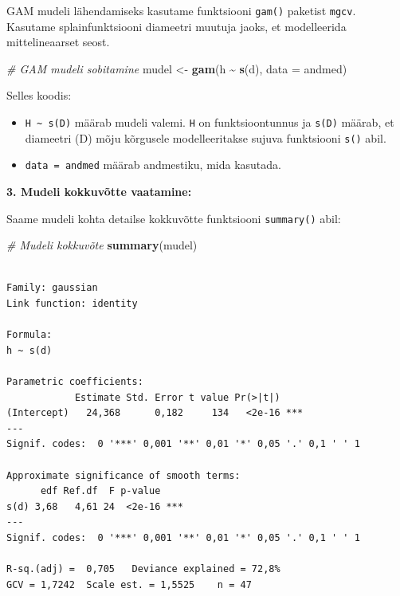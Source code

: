 \documentclass[
]{book}
\newenvironment{Shaded}{\begin{snugshade}}{\end{snugshade}}
\newcommand{\AttributeTok}[1]{\textcolor[rgb]{0.13,0.29,0.53}{#1}}
\newcommand{\CommentTok}[1]{\textcolor[rgb]{0.56,0.35,0.01}{\textit{#1}}}
\newcommand{\FunctionTok}[1]{\textcolor[rgb]{0.13,0.29,0.53}{\textbf{#1}}}
\newcommand{\NormalTok}[1]{#1}
\newcommand{\OtherTok}[1]{\textcolor[rgb]{0.56,0.35,0.01}{#1}}
\newcommand{\SpecialCharTok}[1]{\textcolor[rgb]{0.81,0.36,0.00}{\textbf{#1}}}
\providecommand{\tightlist}{%
  \setlength{\itemsep}{0pt}\setlength{\parskip}{0pt}}
\renewenvironment{Shaded} {\begin{snugshade}\footnotesize} {\end{snugshade}}
\theoremstyle{definition}
\theoremstyle{definition}
\theoremstyle{definition}
\theoremstyle{definition}
\theoremstyle{remark}
\begin{document}
GAM mudeli lähendamiseks kasutame funktsiooni \texttt{gam()} paketist \texttt{mgcv}. Kasutame splainfunktsiooni diameetri muutuja jaoks, et modelleerida mittelineaarset seost.

\begin{Shaded}
\begin{Highlighting}[]
\CommentTok{\# GAM mudeli sobitamine}
\NormalTok{mudel }\OtherTok{\textless{}{-}} \FunctionTok{gam}\NormalTok{(h }\SpecialCharTok{\textasciitilde{}} \FunctionTok{s}\NormalTok{(d), }\AttributeTok{data =}\NormalTok{ andmed)}
\end{Highlighting}
\end{Shaded}

Selles koodis:

\begin{itemize}
\tightlist
\item
  \texttt{H\ \textasciitilde{}\ s(D)} määrab mudeli valemi. \texttt{H} on funktsioontunnus ja \texttt{s(D)} määrab, et diameetri (D) mõju kõrgusele modelleeritakse sujuva funktsiooni \texttt{s()} abil.
\item
  \texttt{data\ =\ andmed} määrab andmestiku, mida kasutada.
\end{itemize}

\textbf{3. Mudeli kokkuvõtte vaatamine:}

Saame mudeli kohta detailse kokkuvõtte funktsiooni \texttt{summary()} abil:

\begin{Shaded}
\begin{Highlighting}[]
\CommentTok{\# Mudeli kokkuvõte}
\FunctionTok{summary}\NormalTok{(mudel)}
\end{Highlighting}
\end{Shaded}

\begin{verbatim}

Family: gaussian 
Link function: identity 

Formula:
h ~ s(d)

Parametric coefficients:
            Estimate Std. Error t value Pr(>|t|)    
(Intercept)   24,368      0,182     134   <2e-16 ***
---
Signif. codes:  0 '***' 0,001 '**' 0,01 '*' 0,05 '.' 0,1 ' ' 1

Approximate significance of smooth terms:
      edf Ref.df  F p-value    
s(d) 3,68   4,61 24  <2e-16 ***
---
Signif. codes:  0 '***' 0,001 '**' 0,01 '*' 0,05 '.' 0,1 ' ' 1

R-sq.(adj) =  0,705   Deviance explained = 72,8%
GCV = 1,7242  Scale est. = 1,5525    n = 47
\end{verbatim}
\end{document}
